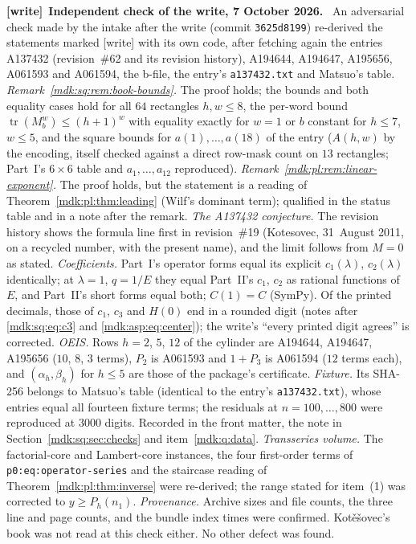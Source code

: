 \documentclass[11pt,letterpaper]{article}
\numberwithin{equation}{section}
\theoremstyle{remark}\newtheorem{remark}[theorem]{Remark}
\DeclareMathOperator{\tr}{tr}\DeclareMathOperator{\TV}{TV}
\newcommand{\file}[1]{\nolinkurl{#1}}
\newenvironment{writenote}[1][]{\par\smallskip\begingroup\small
 \noindent\textbf{[write]}\if\relax\detokenize{#1}\relax\else~\textbf{#1.}\fi\ }%
 {\par\endgroup\smallskip}
\begin{document}
\begin{writenote}[Independent check of the write, 7 October 2026]
An adversarial check made by the intake after the write (commit \file{3625d8199}) re-derived the statements marked [write] with its own code, after fetching again the entries A137432 (revision~\#62 and its revision history), A194644, A194647, A195656, A061593 and A061594, the b-file, the entry's \file{a137432.txt} and Matsuo's table. \emph{Remark~\ref{mdk:sq:rem:book-bounds}.} The proof holds; the bounds and both equality cases hold for all $64$ rectangles $h,w\le8$, the per-word bound $\tr(M_b^w)\le(h+1)^w$ with equality exactly for $w=1$ or $b$ constant for $h\le7$, $w\le5$, and the square bounds for $a(1),\dots,a(18)$ of the entry ($A(h,w)$ by the encoding, itself checked against a direct row-mask count on $13$ rectangles; Part~I's $6\times6$ table and $a_1,\dots,a_{12}$ reproduced). \emph{Remark~\ref{mdk:pl:rem:linear-exponent}.} The proof holds, but the statement is a reading of Theorem~\ref{mdk:pl:thm:leading} (Wilf's dominant term); qualified in the status table and in a note after the remark. \emph{The A137432 conjecture.} The revision history shows the formula line first in revision~\#19 (Kotesovec, 31~August 2011, on a recycled number, with the present name), and the limit follows from $M=0$ as stated. \emph{Coefficients.} Part~I's operator forms equal its explicit $c_1(\lambda)$, $c_2(\lambda)$ identically; at $\lambda=1$, $q=1/E$ they equal Part~II's $c_1$, $c_2$ as rational functions of $E$, and Part~II's short forms equal both; $C(1)=C$ (SymPy). Of the printed decimals, those of $c_1$, $c_3$ and $H(0)$ end in a rounded digit (notes after \eqref{mdk:sq:eq:c3} and \eqref{mdk:asp:eq:center}); the write's ``every printed digit agrees'' is corrected. \emph{OEIS.} Rows $h=2$, $5$, $12$ of the cylinder are A194644, A194647, A195656 ($10$, $8$, $3$ terms), $P_2$ is A061593 and $1+P_3$ is A061594 ($12$ terms each), and $(\alpha_h,\beta_h)$ for $h\le5$ are those of the package's certificate. \emph{Fixture.} Its SHA-256 belongs to Matsuo's table (identical to the entry's \file{a137432.txt}), whose entries equal all fourteen fixture terms; the residuals at $n=100,\dots,800$ were reproduced at $3000$ digits. Recorded in the front matter, the note in Section~\ref{mdk:sq:sec:checks} and item~\ref{mdk:q:data}. \emph{Transseries volume.} The factorial-core and Lambert-core instances, the four first-order terms of \file{p0:eq:operator-series} and the staircase reading of Theorem~\ref{mdk:pl:thm:inverse} were re-derived; the range stated for item~(1) was corrected to $y\ge P_h(n_1)$. \emph{Provenance.} Archive sizes and file counts, the three line and page counts, and the bundle index times were confirmed. Kot\v e\v sovec's book was not read at this check either. No other defect was found.
\end{writenote}
\end{document}
